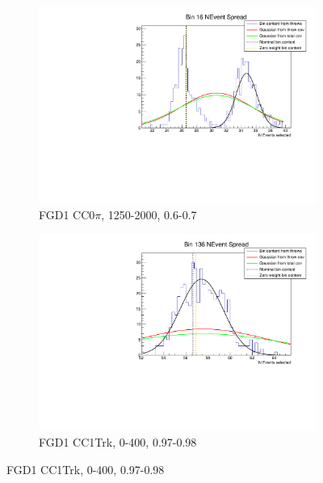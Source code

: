 \begin{figure}[h]
	\begin{subfigure}[t]{0.42\textwidth}
		\includegraphics[width=\textwidth, trim={4mm 3mm 2mm 2mm}, clip,page=1]{figures/numu/syst/bad_bin}
		\caption{FGD1 CC0$\pi$, 1250-2000, 0.6-0.7}
	\end{subfigure}
	\begin{subfigure}[t]{0.42\textwidth}
		\includegraphics[width=\textwidth, trim={4mm 3mm 2mm 2mm}, clip,page=1]{figures/numu/syst/decent_bin}
		\caption{FGD1 CC1Trk, 0-400, 0.97-0.98}
	\end{subfigure}


\end{figure}
